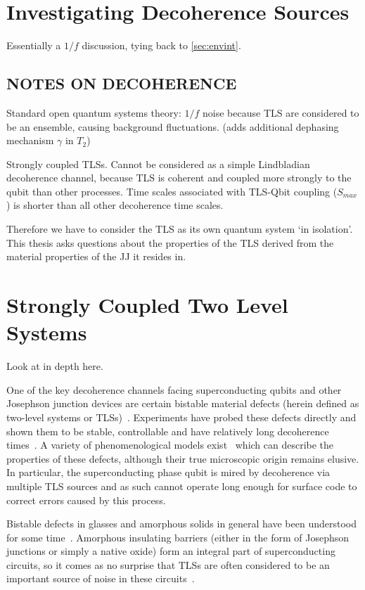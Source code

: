 \section{Investigating Decoherence Sources}

Essentially a $1/f$ \cite{Dutta1981} discussion, tying back to \cref{sec:envint}.


\subsection{NOTES ON DECOHERENCE}
Standard open quantum systems theory:  $1/f$ noise because TLS are considered to be an ensemble, causing background fluctuations. (adds additional dephasing mechanism $\gamma$ in $T_2$)


Strongly coupled TLSs. Cannot be considered as a simple Lindbladian decoherence channel,
because TLS is coherent and coupled more strongly to the qubit than other processes.
Time scales associated with TLS-Qbit coupling ($S_{max}$) is shorter than all other decoherence time scales.

Therefore we have to consider the TLS as its own quantum system `in isolation'.
This thesis asks questions about the properties of the TLS derived from the material properties of the JJ it resides in.



\section{Strongly Coupled Two Level Systems}
Look at \cite{Enss2005} in depth here.


One of the key decoherence channels facing superconducting qubits and other Josephson junction devices are certain bistable material defects (herein defined as two-level systems or TLSs)~\cite{Dutta1981, Shnirman2005}.
Experiments have probed these defects directly and shown them to be stable, controllable and have relatively long decoherence times~\cite{Simmonds2004, Neeley2008, Shalibo2010, Lupascu2009, Lisenfeld2010, Gunnarsson2013}.
A variety of phenomenological models exist~\cite{Martinis2005, DeSousa2009, Sendelbach2008, Faoro2007,Ku2005} which can describe the properties of these defects, although their true microscopic origin remains elusive.
In particular, the superconducting phase qubit is mired by decoherence via multiple TLS sources and as such cannot operate long enough for surface code to correct errors caused by this process.


Bistable defects in glasses and amorphous solids in general have been understood for some time~\cite{Anderson1972}.
Amorphous insulating barriers (either in the form of Josephson junctions or simply a native oxide) form an integral part of superconducting circuits, so it comes as no surprise that TLSs are often considered to be an important source of noise in these circuits~\cite{Dutta1981, Shnirman2005, Martinis2005}.


